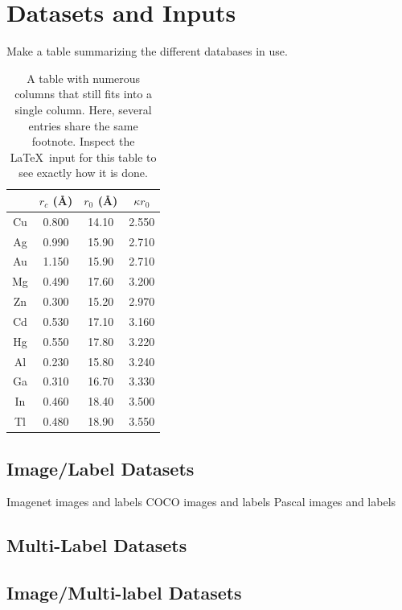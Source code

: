 \documentclass[10pt, a4paper, twocolumn]{article} %
\begin{document}
\section{Datasets and Inputs} %

Make a table summarizing the different databases in use.

\begin{table}[b]
\caption{\label{tab:table2}
A table with numerous columns that still fits into a single column. 
Here, several entries share the same footnote. 
Inspect the \LaTeX\ input for this table to see exactly how it is done.}
\begin{ruledtabular}
\begin{tabular}{cccc}
 &$r_c$ (\AA)&$r_0$ (\AA)&$\kappa r_0$\\
\hline
Cu& 0.800 & 14.10 & 2.550\\
Ag& 0.990 & 15.90 & 2.710\\
Au& 1.150 & 15.90 & 2.710\\
Mg& 0.490 & 17.60 & 3.200\\
Zn& 0.300 & 15.20 & 2.970\\
Cd& 0.530 & 17.10 & 3.160\\
Hg& 0.550 & 17.80 & 3.220\\
Al& 0.230 & 15.80 & 3.240\\
Ga& 0.310 & 16.70 & 3.330\\
In& 0.460 & 18.40 & 3.500\\
Tl& 0.480 & 18.90 & 3.550\\
\end{tabular}
\end{ruledtabular}
\end{table}

\subsection{Image/Label Datasets}

Imagenet images and labels
COCO images and labels
Pascal images and labels

\subsection{Multi-Label Datasets}

\subsection{Image/Multi-label Datasets}
\end{document}
